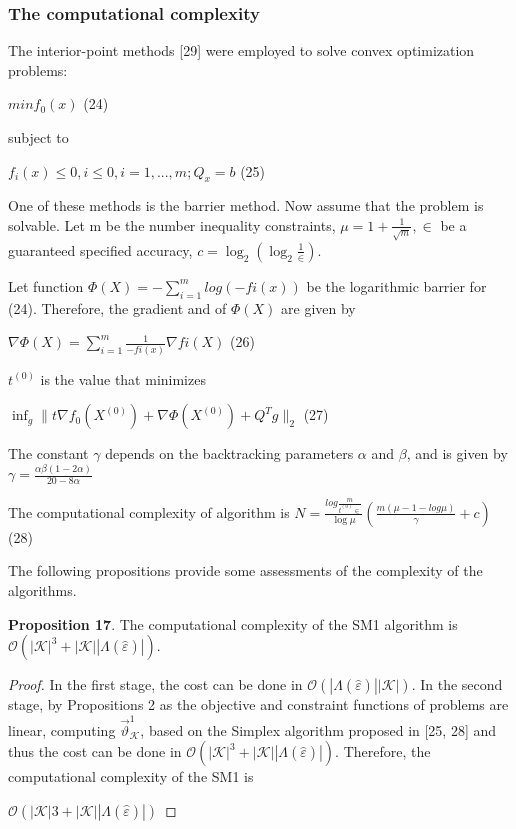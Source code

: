 \documentclass[]{iosart2c}
\begin{document}
    \subsubsection{The computational complexity}
    The interior-point methods [29] were employed to
    solve convex optimization problems:

    $min f_0(x)$ (24)

    subject to

    $f_i(x) \le 0, i \le 0, i = 1, ...,m;Q_x = b$ (25)

    One of these methods is the barrier method. Now assume that the problem is solvable. Let m be the number inequality constraints, $\mu = 1 + \frac{1}{\sqrt{m}}, \in$ be a
    guaranteed specified accuracy, $c = \log_2 (\log_2 \frac{1}{\in})$.

    Let function $\Phi(X) = -\sum^m_{i=1} log(-fi(x))$ be the
    logarithmic barrier for (24). Therefore, the gradient
    and of $\Phi(X)$ are given by

    $\nabla \Phi(X) = \sum^m_{i=1} \frac{1}{-fi(x)} \nabla fi(X)$ (26)

    $t^{(0)}$ is the value that minimizes

    $\inf_g \parallel t\nabla f_0 \left( X^{(0)} \right) + \nabla \Phi \left( X^{(0)} \right) + Q^T g \parallel _2$ (27)

    The constant $\gamma$ depends on the backtracking
    parameters $\alpha$ and $\beta$, and is given by $\gamma =  \frac{\alpha\beta(1-2\alpha)}{20-8\alpha}$

    The computational complexity of algorithm is
    $N = \frac{log \frac{m}{t^{(0)} \in}}{ \log\mu }
    \left( \frac{m(\mu - 1 - log\mu)}{\gamma} + c \right)$ (28)

    The following propositions provide some assessments of the complexity of the algorithms.

    \textbf{Proposition 17}. The computational complexity of the
    SM1 algorithm is $\mathcal{O}(|\mathcal{K}|^3 + |\mathcal{K}| |\Lambda(\hat{\varepsilon} )|)$.

    \begin{proof}
        In the first stage, the cost can be done in
        $\mathcal{O}(|\Lambda(\hat{\varepsilon})| |\mathcal{K}|)$. In the second stage, by Propositions
        2 as the objective and constraint functions of problems
        are linear, computing $\vec{\vartheta}^1_\mathcal{K}$, based on the Simplex
        algorithm proposed in [25, 28] and thus the cost can
        be done in $\mathcal{O}(|\mathcal{K}|^3 + |\mathcal{K}| |\Lambda(\hat{\varepsilon})|)$. Therefore, the computational
        complexity of the SM1 is

        $\mathcal{O}(|\mathcal{K}|3 + |\mathcal{K}| |\Lambda(\hat{\varepsilon})|)$
    \end{proof}
\end{document}
